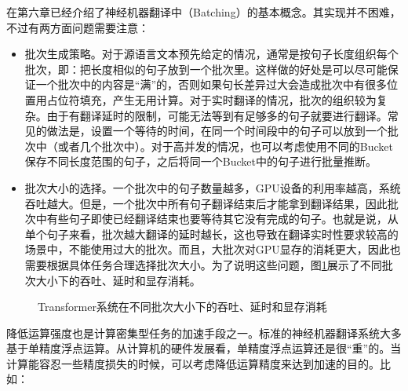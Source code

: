 \parinterval 在第六章已经介绍了神经机器翻译中{\small{}}（Batching）的基本概念。其实现并不困难，不过有两方面问题需要注意：

\begin{itemize}
\vspace{0.5em}
\item 批次生成策略。对于源语言文本预先给定的情况，通常是按句子长度组织每个批次，即：把长度相似的句子放到一个批次里。这样做的好处是可以尽可能保证一个批次中的内容是``满''的，否则如果句长差异过大会造成批次中有很多位置用占位符填充，产生无用计算。对于实时翻译的情况，批次的组织较为复杂。由于有翻译延时的限制，可能无法等到有足够多的句子就要进行翻译。常见的做法是，设置一个等待的时间，在同一个时间段中的句子可以放到一个批次中（或者几个批次中）。对于高并发的情况，也可以考虑使用不同的Bucket保存不同长度范围的句子，之后将同一个Bucket中的句子进行批量推断。
\vspace{0.5em}
\item 批次大小的选择。一个批次中的句子数量越多，GPU设备的利用率越高，系统吞吐越大。但是，一个批次中所有句子翻译结束后才能拿到翻译结果，因此批次中有些句子即使已经翻译结束也要等待其它没有完成的句子。也就是说，从单个句子来看，批次越大翻译的延时越长，这也导致在翻译实时性要求较高的场景中，不能使用过大的批次。而且，大批次对GPU显存的消耗更大，因此也需要根据具体任务合理选择批次大小。为了说明这些问题，图\ref{fig:7-23}展示了不同批次大小下的吞吐、延时和显存消耗。
\vspace{0.5em}
\end{itemize}

\begin{figure}[htp]
\centering

\caption{Transformer系统在不同批次大小下的吞吐、延时和显存消耗}
\label{fig:7-23}
\end{figure}

\vspace{0.5em}
\vspace{0.5em}

\parinterval 降低运算强度也是计算密集型任务的加速手段之一。标准的神经机器翻译系统大多基于单精度浮点运算。从计算机的硬件发展看，单精度浮点运算还是很``重''的。当计算能容忍一些精度损失的时候，可以考虑降低运算精度来达到加速的目的。比如：

